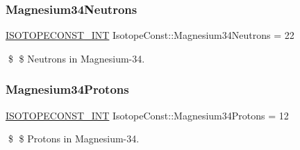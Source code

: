 \subsubsection{\texorpdfstring{Magnesium34\+Neutrons}{Magnesium34Neutrons}}
{\footnotesize\ttfamily \mbox{\hyperlink{group___isotope_const-_macros_ga5f18360b3e99483a35c32d789e62621c}{I\+S\+O\+T\+O\+P\+E\+C\+O\+N\+S\+T\+\_\+\+I\+NT}} Isotope\+Const\+::\+Magnesium34\+Neutrons = 22}

\$ \$ Neutrons in Magnesium-\/34. \mbox{\label{group___isotope_const-_magnesium-_mg34_gade0910768af4518500bda8bcb3e80065}} 
\subsubsection{\texorpdfstring{Magnesium34\+Protons}{Magnesium34Protons}}
{\footnotesize\ttfamily \mbox{\hyperlink{group___isotope_const-_macros_ga5f18360b3e99483a35c32d789e62621c}{I\+S\+O\+T\+O\+P\+E\+C\+O\+N\+S\+T\+\_\+\+I\+NT}} Isotope\+Const\+::\+Magnesium34\+Protons = 12}

\$ \$ Protons in Magnesium-\/34. 